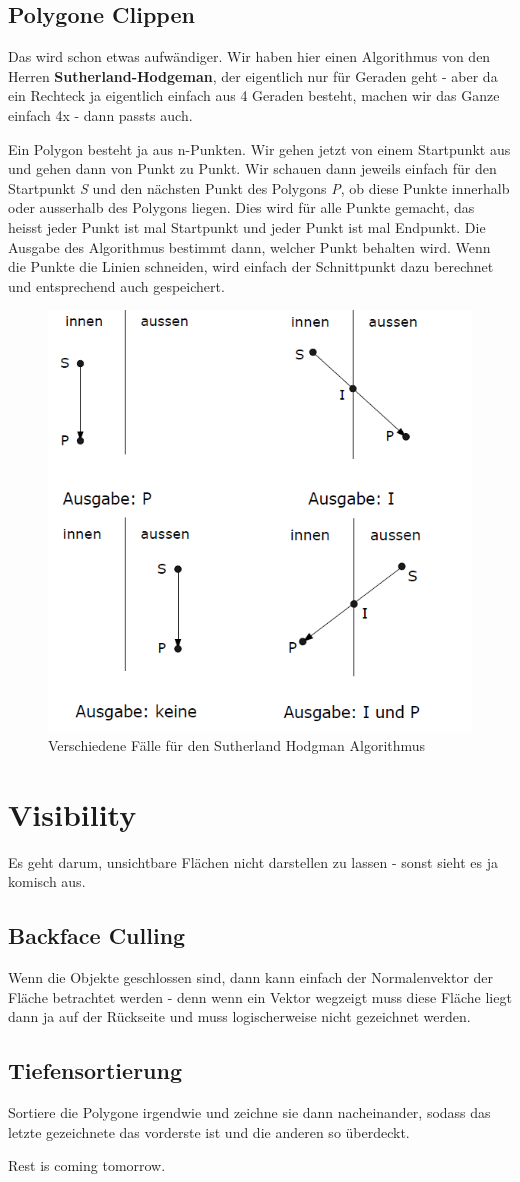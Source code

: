 \subsection{Polygone Clippen}
Das wird schon etwas aufwändiger. Wir haben hier einen Algorithmus von den Herren \textbf{Sutherland-Hodgeman}, der eigentlich nur für Geraden geht - aber da ein Rechteck ja eigentlich einfach aus 4 Geraden besteht, machen wir das Ganze einfach 4x - dann passts auch.

Ein Polygon besteht ja aus n-Punkten. Wir gehen jetzt von einem Startpunkt aus und gehen dann von Punkt zu Punkt. Wir schauen dann jeweils einfach für den Startpunkt \textit{S} und den nächsten Punkt des Polygons \textit{P}, ob diese Punkte innerhalb oder ausserhalb des Polygons liegen. Dies wird für alle Punkte gemacht, das heisst jeder Punkt ist mal Startpunkt und jeder Punkt ist mal Endpunkt. Die Ausgabe des Algorithmus bestimmt dann, welcher Punkt behalten wird. Wenn die Punkte die Linien schneiden, wird einfach der Schnittpunkt dazu berechnet und entsprechend auch gespeichert.
	
	\begin{figure}[!ht]
		\centering
		\includegraphics[width=0.5\linewidth]{fig/sutherland_hodgman}
		\caption{Verschiedene Fälle für den Sutherland Hodgman Algorithmus}
		\label{fig:sutherland_hodgman}
	\end{figure}

\section{Visibility}
Es geht darum, unsichtbare Flächen nicht darstellen zu lassen - sonst sieht es ja komisch aus.

\subsection{Backface Culling}
Wenn die Objekte geschlossen sind, dann kann einfach der Normalenvektor der Fläche betrachtet werden - denn wenn ein Vektor wegzeigt muss diese Fläche liegt dann ja auf der Rückseite und muss logischerweise nicht gezeichnet werden.

\subsection{Tiefensortierung}
Sortiere die Polygone irgendwie und zeichne sie dann nacheinander, sodass das letzte gezeichnete das vorderste ist und die anderen so überdeckt.

Rest is coming tomorrow.

